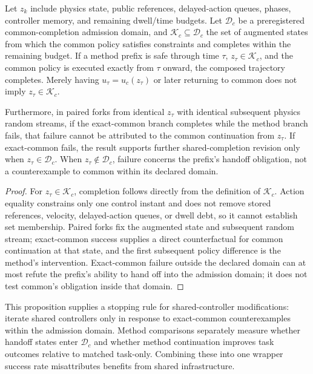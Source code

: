 \begin{proposition}
Let $z_k$ include physics state, public references, delayed-action queues, phases, controller memory,
and remaining dwell/time budgets. Let $\mathcal D_c$ be a preregistered common-completion
admission domain, and $\mathcal K_c\subseteq\mathcal D_c$ the set of augmented states from which the common
policy satisfies constraints and completes within the remaining budget. If a method prefix is safe through time $\tau$,
$z_\tau\in\mathcal K_c$, and the common policy is executed exactly from $\tau$ onward, the composed trajectory completes.
Merely having $u_\tau=u_c(z_\tau)$ or later returning to common does not imply
$z_\tau\in\mathcal K_c$.

Furthermore, in paired forks from identical $z_\tau$ with identical subsequent physics random streams, if the exact-common
branch completes while the method branch fails, that failure cannot be attributed to the common continuation from $z_\tau$.
If exact-common fails, the result supports further shared-completion revision only when $z_\tau\in\mathcal D_c$.
When $z_\tau\notin\mathcal D_c$, failure concerns the prefix's handoff obligation,
not a counterexample to common within its declared domain.
\end{proposition}
\begin{proof}
For $z_\tau\in\mathcal K_c$, completion follows directly from the definition of $\mathcal K_c$.
Action equality constrains only one control instant and does not remove stored references, velocity, delayed-action queues,
or dwell debt, so it cannot establish set membership. Paired forks fix the augmented state and subsequent random stream;
exact-common success supplies a direct counterfactual for common continuation at that state, and the first subsequent
policy difference is the method's intervention. Exact-common failure outside the declared domain can at most
refute the prefix's ability to hand off into the admission domain; it does not test common's obligation inside that domain.
\end{proof}
This proposition supplies a stopping rule for shared-controller modifications: iterate shared controllers only in response to
exact-common counterexamples within the admission domain. Method comparisons separately measure whether handoff states enter
$\mathcal D_c$ and whether method continuation improves task outcomes relative to matched task-only.
Combining these into one wrapper success rate misattributes benefits from shared infrastructure.

